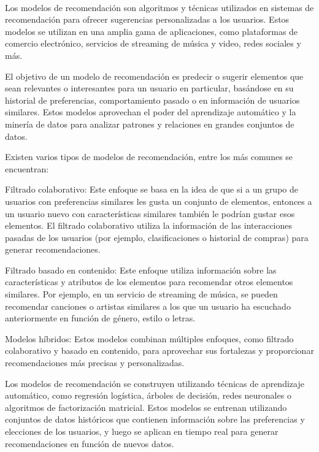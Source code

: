 \\
Los modelos de recomendación son algoritmos y técnicas utilizados en sistemas de recomendación para ofrecer sugerencias personalizadas a los usuarios. Estos modelos se utilizan en una amplia gama de aplicaciones, como plataformas de comercio electrónico, servicios de streaming de música y video, redes sociales y más.

El objetivo de un modelo de recomendación es predecir o sugerir elementos que sean relevantes o interesantes para un usuario en particular, basándose en su historial de preferencias, comportamiento pasado o en información de usuarios similares. Estos modelos aprovechan el poder del aprendizaje automático y la minería de datos para analizar patrones y relaciones en grandes conjuntos de datos.

Existen varios tipos de modelos de recomendación, entre los más comunes se encuentran:

Filtrado colaborativo: Este enfoque se basa en la idea de que si a un grupo de usuarios con preferencias similares les gusta un conjunto de elementos, entonces a un usuario nuevo con características similares también le podrían gustar esos elementos. El filtrado colaborativo utiliza la información de las interacciones pasadas de los usuarios (por ejemplo, clasificaciones o historial de compras) para generar recomendaciones.

Filtrado basado en contenido: Este enfoque utiliza información sobre las características y atributos de los elementos para recomendar otros elementos similares. Por ejemplo, en un servicio de streaming de música, se pueden recomendar canciones o artistas similares a los que un usuario ha escuchado anteriormente en función de género, estilo o letras.

Modelos híbridos: Estos modelos combinan múltiples enfoques, como filtrado colaborativo y basado en contenido, para aprovechar sus fortalezas y proporcionar recomendaciones más precisas y personalizadas.

Los modelos de recomendación se construyen utilizando técnicas de aprendizaje automático, como regresión logística, árboles de decisión, redes neuronales o algoritmos de factorización matricial. Estos modelos se entrenan utilizando conjuntos de datos históricos que contienen información sobre las preferencias y elecciones de los usuarios, y luego se aplican en tiempo real para generar recomendaciones en función de nuevos datos.

